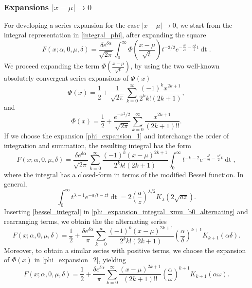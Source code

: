 \documentclass[10pt,a4paper,oneside]{article}
\numberwithin{equation}{section}
\begin{document}
\subsubsection{Expansions $|x-\mu| \to 0$}
For developing a series expansion for the case $|x-\mu| \to 0$, we start from the integral representation in \eqref{integral_phi}, after expanding the square
\begin{equation}\label{integral_phi2}
F(x; \alpha, 0, \mu, \delta) = \frac{\delta e^{\delta \alpha}}{\sqrt{2\pi}} \int_0^{\infty} \Phi\left(\frac{x - \mu}{\sqrt{t}}\right) t^{-3/2} e^{-\frac{\delta^2}{2t} - \frac{\alpha^2}{2}t} \mathop{dt}.
\end{equation}
We proceed expanding the term $\Phi\left(\frac{x-\mu}{\sqrt{t}}\right)$, by using the two well-known absolutely convergent series expansions of $\Phi(x)$ \cite[\S 2]{Lebedev1972}
\begin{equation}\label{phi_expansion_1}
\Phi(x) = \frac{1}{2} + \frac{1}{\sqrt{2\pi}}\sum_{k=0}^{\infty} \frac{(-1)^k x^{2k + 1}}{2^k k! (2k+1)},
\end{equation}
and
\begin{equation}\label{phi_expansion_2}
\Phi(x) = \frac{1}{2} + \frac{e^{-x^2 / 2}}{\sqrt{2\pi}}\sum_{k=0}^{\infty} \frac{x^{2k+1}}{(2k + 1)!!}.
\end{equation}
If we choose the expansion \eqref{phi_expansion_1} and interchange the order of integration and summation, the resulting integral has the form
\begin{equation}\label{phi_expansion_integral_xmu_b0_alternating}
F(x; \alpha, 0, \mu, \delta) = \frac{\delta e^{\delta \alpha}}{\sqrt{2\pi}} \sum_{k=0}^{\infty} \frac{(-1)^k (x-\mu)^{2k + 1}}{2^k k! (2k + 1)}\int_0^{\infty} t^{-k-2} e^{-\frac{\delta^2}{2t} - \frac{\alpha^2}{2}t} \mathop{dt},
\end{equation}
where the integral has a closed-form in terms of the modified Bessel function. In general,
\begin{equation}\label{bessel_integral}
\int_0^{\infty} t^{\lambda - 1}e^{-a/t - zt} \mathop{dt} = 2\left(\frac{a}{z}\right)^{\lambda/2} K_{\lambda}(2\sqrt{a z}).
\end{equation}
Inserting \eqref{bessel_integral} in \eqref{phi_expansion_integral_xmu_b0_alternating} and rearranging terms, we obtain the the alternating series
\begin{equation}\label{expansion_xmu_b0_alternating}
F(x; \alpha, 0, \mu, \delta) = \frac{1}{2} + \frac{\delta e^{\delta \alpha}}{\pi}\sum_{k=0}^{\infty} \frac{(-1)^k (x-\mu)^{2k+1}}{2^k k! (2k + 1)} \left(\frac{\alpha}{\delta}\right)^{k+1}K_{k+1}(\alpha \delta).
\end{equation}
Moreover, to obtain a similar series with positive terms, we choose the expansion of $\Phi(x)$ in \eqref{phi_expansion_2}, yielding
\begin{equation}\label{expansion_xmu_b0_positive}
F(x; \alpha, 0, \mu, \delta) = \frac{1}{2} + \frac{\delta e^{\delta \alpha}} {\pi}\sum_{k=0}^{\infty} \frac{(x-\mu)^{2k+1}}{(2k +1)!!} \left(\frac{\alpha}{\omega}\right)^{k+1}K_{k+1}(\alpha \omega).
\end{equation}
\end{document}
